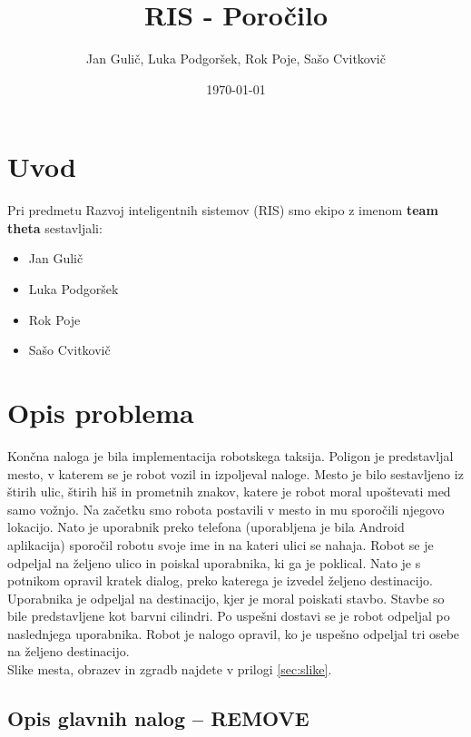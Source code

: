 \documentclass[a4paper,11pt]{article}
\title{RIS - Poročilo}
\author{Jan Gulič, Luka Podgoršek, Rok Poje, Sašo Cvitkovič}
\date{\today}
\begin{document}
\maketitle
\section{Uvod}

Pri predmetu Razvoj inteligentnih sistemov (RIS) smo ekipo z imenom \textbf{team theta} sestavljali:
\begin{itemize}
	\item Jan Gulič
	\item Luka Podgoršek
	\item Rok Poje
	\item Sašo Cvitkovič
\end{itemize}


\section{Opis problema}

Končna naloga je bila implementacija robotskega taksija. Poligon je predstavljal mesto, v katerem se je robot vozil in izpoljeval naloge. Mesto je bilo sestavljeno iz štirih ulic, štirih hiš in prometnih znakov, katere je robot moral upoštevati med samo vožnjo. Na začetku smo robota postavili v mesto in mu sporočili njegovo lokacijo. Nato je uporabnik preko telefona (uporabljena je bila Android aplikacija) sporočil robotu svoje ime in na kateri ulici se nahaja. Robot se je odpeljal na željeno ulico in poiskal uporabnika, ki ga je poklical. Nato je s potnikom opravil kratek dialog, preko katerega je izvedel željeno destinacijo. Uporabnika je odpeljal na destinacijo, kjer je moral poiskati stavbo. Stavbe so bile predstavljene kot barvni cilindri. Po uspešni dostavi se je robot odpeljal po naslednjega uporabnika. 
Robot je nalogo opravil, ko je uspešno odpeljal tri osebe na željeno destinacijo.\\


Slike mesta, obrazev in zgradb najdete v prilogi \ref{sec:slike}.


\subsection{Opis glavnih nalog -- REMOVE}
\end{document}
